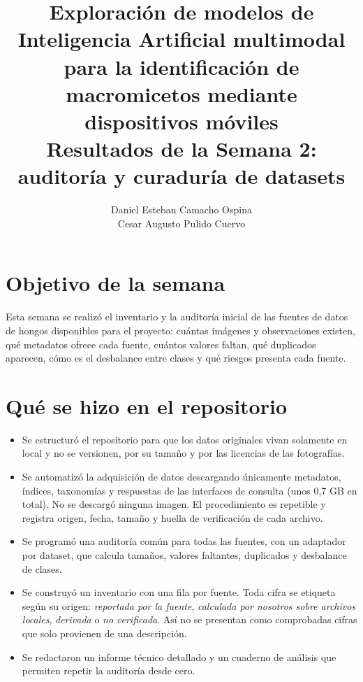 \documentclass[11pt,a4paper]{article}
\title{
    \textbf{Exploración de modelos de Inteligencia Artificial multimodal\\
    para la identificación de macromicetos mediante dispositivos móviles}\\[0.6em]
    \normalsize Resultados de la Semana 2: auditoría y curaduría de datasets
}
\author{
    Daniel Esteban Camacho Ospina\\
    Cesar Augusto Pulido Cuervo
}
\date{}
\begin{document}
\maketitle

\section{Objetivo de la semana}

Esta semana se realizó el inventario y la auditoría inicial de las fuentes de
datos de hongos disponibles para el proyecto: cuántas imágenes y observaciones
existen, qué metadatos ofrece cada fuente, cuántos valores faltan, qué
duplicados aparecen, cómo es el desbalance entre clases y qué riesgos presenta
cada fuente.

\section{Qué se hizo en el repositorio}

\begin{itemize}
    \item Se estructuró el repositorio para que los datos originales vivan
    solamente en local y no se versionen, por su tamaño y por las licencias de
    las fotografías.

    \item Se automatizó la adquisición de datos descargando únicamente metadatos, índices, taxonomías y
    respuestas de las interfaces de consulta (unos 0,7 GB en total). No
    se descargó ninguna imagen. El procedimiento es repetible y registra origen,
    fecha, tamaño y huella de verificación de cada archivo.

    \item Se programó una auditoría común para todas las fuentes, con un
    adaptador por dataset, que calcula tamaños, valores faltantes, duplicados y
    desbalance de clases.

    \item Se construyó un inventario con una fila por fuente. Toda cifra se
    etiqueta según su origen: \textit{reportada por la fuente}, \textit{calculada
    por nosotros sobre archivos locales}, \textit{derivada} o \textit{no
    verificada}. Así no se presentan como comprobadas cifras que solo provienen
    de una descripción.

    \item Se redactaron un informe técnico detallado y un cuaderno de análisis
    que permiten repetir la auditoría desde cero.
\end{itemize}
\end{document}
